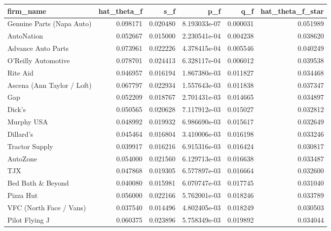 \begin{tabular}{lrrrrr}
\toprule
                 firm\_name &  hat\_theta\_f &      s\_f &          p\_f &      q\_f &  hat\_theta\_f\_star \\
\midrule
 Genuine Parts (Napa Auto) &     0.098171 & 0.020480 & 8.193033e-07 & 0.000031 &          0.051989 \\
                AutoNation &     0.052667 & 0.015000 & 2.230541e-04 & 0.004238 &          0.038620 \\
        Advance Auto Parts &     0.073961 & 0.022226 & 4.378415e-04 & 0.005546 &          0.040249 \\
       O'Reilly Automotive &     0.078701 & 0.024413 & 6.328117e-04 & 0.006012 &          0.039538 \\
                  Rite Aid &     0.046957 & 0.016194 & 1.867380e-03 & 0.011827 &          0.034468 \\
Ascena (Ann Taylor / Loft) &     0.067797 & 0.022934 & 1.557643e-03 & 0.011838 &          0.037347 \\
                       Gap &     0.052209 & 0.018767 & 2.701431e-03 & 0.014665 &          0.034897 \\
                    Dick's &     0.050565 & 0.020628 & 7.117912e-03 & 0.015027 &          0.032812 \\
                Murphy USA &     0.048992 & 0.019932 & 6.986690e-03 & 0.015617 &          0.032649 \\
                 Dillard's &     0.045464 & 0.016804 & 3.410006e-03 & 0.016198 &          0.033246 \\
            Tractor Supply &     0.039917 & 0.016216 & 6.915316e-03 & 0.016424 &          0.030817 \\
                  AutoZone &     0.054000 & 0.021560 & 6.129713e-03 & 0.016638 &          0.033487 \\
                       TJX &     0.047868 & 0.019305 & 6.577897e-03 & 0.016664 &          0.032600 \\
         Bed Bath \& Beyond &     0.040080 & 0.015981 & 6.070747e-03 & 0.017745 &          0.031040 \\
                 Pizza Hut &     0.056000 & 0.022166 & 5.762001e-03 & 0.018246 &          0.033789 \\
   VFC (North Face / Vans) &     0.037540 & 0.014496 & 4.802405e-03 & 0.018249 &          0.030503 \\
            Pilot Flying J &     0.060375 & 0.023896 & 5.758349e-03 & 0.019892 &          0.034044 \\

\end{tabular}

